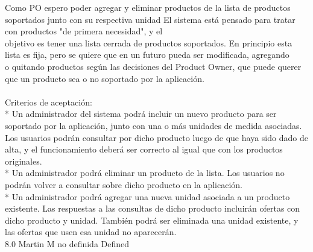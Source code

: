 	{Como PO espero poder agregar y eliminar productos de la lista de productos soportados junto con su respectiva unidad} %
	{El sistema está pensado para tratar con productos "de primera necesidad", y el\\
objetivo es tener una lista cerrada de productos soportados. En principio esta\\
lista es fija, pero se quiere que en un futuro pueda ser modificada, agregando\\
o quitando productos según las decisiones del Product Owner, que puede querer\\
que un producto sea o no soportado por la aplicación.\\
  \\
Criterios de aceptación:\\
* Un administrador del sistema podrá incluir un nuevo producto para ser soportado por la aplicación, junto con una o más unidades de medida asociadas. Los usuarios podrán consultar por dicho producto luego de que haya sido dado de alta, y el funcionamiento deberá ser correcto al igual que con los productos originales.  \\
* Un administrador podrá eliminar un producto de la lista. Los usuarios no podrán volver a consultar sobre dicho producto en la aplicación.  \\
* Un administrador podrá agregar una nueva unidad asociada a un producto existente. Las respuestas a las consultas de dicho producto incluirán ofertas con dicho producto y unidad. También podrá ser eliminada una unidad existente, y las ofertas que usen esa unidad no aparecerán.\\
} %
	{} %
	{8.0} %
	{Martin M} %
	{no definida} %
	{Defined} %


\vspace{20pt}

